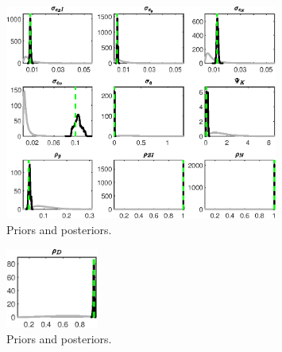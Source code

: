  
\begin{figure}[H]
\centering
\includegraphics[width=0.80\textwidth]{BRS_growth_ext_fd/Output/BRS_growth_ext_fd_PriorsAndPosteriors1}
\caption{Priors and posteriors.}\label{Fig:PriorsAndPosteriors:1}
\end{figure}
 
\begin{figure}[H]
\centering
\includegraphics[width=0.27\textwidth]{BRS_growth_ext_fd/Output/BRS_growth_ext_fd_PriorsAndPosteriors2}
\caption{Priors and posteriors.}\label{Fig:PriorsAndPosteriors:2}
\end{figure}
 
